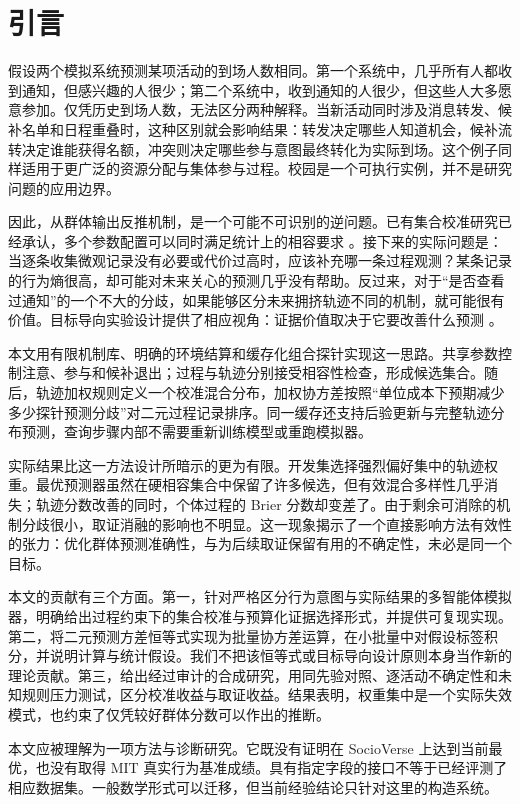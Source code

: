 \section{引言}
假设两个模拟系统预测某项活动的到场人数相同。第一个系统中，几乎所有人都收到通知，但感兴趣的人很少；第二个系统中，收到通知的人很少，但这些人大多愿意参加。仅凭历史到场人数，无法区分两种解释。当新活动同时涉及消息转发、候补名单和日程重叠时，这种区别就会影响结果：转发决定哪些人知道机会，候补流转决定谁能获得名额，冲突则决定哪些参与意图最终转化为实际到场。这个例子同样适用于更广泛的资源分配与集体参与过程。校园是一个可执行实例，并不是研究问题的应用边界。

因此，从群体输出反推机制，是一个可能不可识别的逆问题。已有集合校准研究已经承认，多个参数配置可以同时满足统计上的相容要求 \citep{bai2022}。接下来的实际问题是：当逐条收集微观记录没有必要或代价过高时，应该补充哪一条过程观测？某条记录的行为熵很高，却可能对未来关心的预测几乎没有帮助。反过来，对于“是否查看过通知”的一个不大的分歧，如果能够区分未来拥挤轨迹不同的机制，就可能很有价值。目标导向实验设计提供了相应视角：证据价值取决于它要改善什么预测 \citep{chaloner1995,attia2018,zhong2026}。

本文用有限机制库、明确的环境结算和缓存化组合探针实现这一思路。共享参数控制注意、参与和候补退出；过程与轨迹分别接受相容性检查，形成候选集合。随后，轨迹加权规则定义一个校准混合分布，加权协方差按照“单位成本下预期减少多少探针预测分歧”对二元过程记录排序。同一缓存还支持后验更新与完整轨迹分布预测，查询步骤内部不需要重新训练模型或重跑模拟器。

实际结果比这一方法设计所暗示的更为有限。开发集选择强烈偏好集中的轨迹权重。最优预测器虽然在硬相容集合中保留了许多候选，但有效混合多样性几乎消失；轨迹分数改善的同时，个体过程的 Brier 分数却变差了。由于剩余可消除的机制分歧很小，取证消融的影响也不明显。这一现象揭示了一个直接影响方法有效性的张力：优化群体预测准确性，与为后续取证保留有用的不确定性，未必是同一个目标。

本文的贡献有三个方面。第一，针对严格区分行为意图与实际结果的多智能体模拟器，明确给出过程约束下的集合校准与预算化证据选择形式，并提供可复现实现。第二，将二元预测方差恒等式实现为批量协方差运算，在小批量中对假设标签积分，并说明计算与统计假设。我们不把该恒等式或目标导向设计原则本身当作新的理论贡献。第三，给出经过审计的合成研究，用同先验对照、逐活动不确定性和未知规则压力测试，区分校准收益与取证收益。结果表明，权重集中是一个实际失效模式，也约束了仅凭较好群体分数可以作出的推断。

本文应被理解为一项方法与诊断研究。它既没有证明在 SocioVerse 上达到当前最优，也没有取得 MIT 真实行为基准成绩。具有指定字段的接口不等于已经评测了相应数据集。一般数学形式可以迁移，但当前经验结论只针对这里的构造系统。
